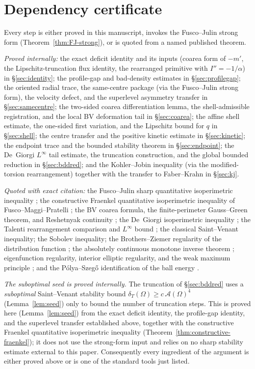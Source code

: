 \documentclass[11pt]{amsart}
\theoremstyle{definition}
\newcommand{\Om}{\Omega}
\newcommand{\Fr}{\mathcal A}
\newcommand{\dT}{\delta_T}
\begin{document}
\section{Dependency certificate}\label{app:constants}

Every step is either proved in this manuscript, invokes the Fusco--Julin strong
form (Theorem~\ref{thm:FJ-strong}), or is quoted from a named published theorem.

\emph{Proved internally:} the exact deficit identity and its inputs (coarea
form of \(-m'\), the Lipschitz-truncation flux identity, the rearranged
primitive with \(I''=-1/\alpha\)) in \S\ref{sec:identity}; the profile-gap and
bad-density estimates in \S\ref{sec:profilegap}; the
oriented radial trace, the same-centre package (via the Fusco--Julin strong
form), the velocity defect, and the
superlevel asymmetry transfer in \S\ref{sec:samecentre}; the two-sided coarea
differentiation lemma, the shell-admissible registration, and the local BV
deformation tail in \S\ref{sec:coarea}; the affine shell estimate, the
one-sided first variation, and the Lipschitz bound for \(q\) in
\S\ref{sec:shell}; the centre transfer and the positive kinetic estimate in
\S\ref{sec:kinetic}; the endpoint trace and the bounded stability theorem in
\S\ref{sec:endpoint}; the De~Giorgi \(L^\infty\) tail estimate, the truncation
construction, and the global bounded reduction in \S\ref{sec:bddred}; and the
Kohler--Jobin inequality (via the modified-torsion rearrangement) together with
the transfer to Faber--Krahn in \S\ref{sec:kj}.

\emph{Quoted with exact citation:} the Fusco--Julin sharp quantitative
isoperimetric inequality \cite{FJ2014}; the constructive Fraenkel quantitative
isoperimetric inequality of Fusco--Maggi--Pratelli \cite{FMP}; the BV coarea
formula, the finite-perimeter Gauss--Green theorem, and Reshetnyak continuity
\cite{AFP2000,Maggi2012}; the De~Giorgi isoperimetric inequality
\cite{DeGiorgi1958}; the Talenti rearrangement comparison and \(L^\infty\) bound
\cite{Talenti1976}; the classical Saint--Venant inequality; the
Sobolev inequality; the Brothers--Ziemer regularity of the distribution
function \cite{AFP2000}; the absolutely continuous monotone inverse theorem
\cite{BBC1975}; eigenfunction regularity, interior elliptic regularity, and the
weak maximum principle \cite{GilbargTrudinger2001}; and the P\'olya--Szeg\H{o}
identification of the ball energy \cite{PolyaSzego1951,Bandle1980}.

\emph{The suboptimal seed is proved internally.} The truncation of
\S\ref{sec:bddred} uses a \emph{suboptimal} Saint--Venant stability bound
\(\dT(\Om)\ge c\,\Fr(\Om)^4\) (Lemma~\ref{lem:seed}) only to bound the number
of truncation steps.  This is proved here (Lemma~\ref{lem:seed}) from the
exact deficit identity, the profile-gap identity, and the superlevel transfer
established above, together with the constructive Fraenkel quantitative
isoperimetric inequality (Theorem~\ref{thm:constructive-fraenkel}); it does
not use the strong-form input and relies on no sharp stability estimate external
to this paper.  Consequently
every ingredient of the argument is either proved above or is one of the
standard tools just listed.
\end{document}
